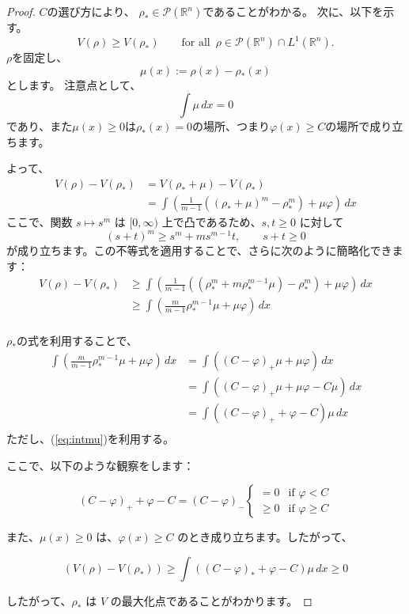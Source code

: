 \documentclass{jsarticle}
\theoremstyle{definition}
\begin{document}
\begin{proof}
  $C$の選び方により、 $\rho_* \in \mathcal{P}(\mathbb{R}^n)$であることがわかる。
  次に、以下を示す。
  $$
  V(\rho) \geq V(\rho_*) \qquad \text{for all } \, \rho \in \mathcal{P}(\mathbb{R}^n) \cap L^1(\mathbb{R}^n).
  $$
  $\rho$を固定し、 
  $$
  \mu(x) := \rho(x) - \rho_*(x)
  $$
  とします。
  注意点として、
  \begin{equation}
    \label{eq:intmu}
     \int \mu \, dx = 0
  \end{equation}
  であり、また$\mu(x) \geq 0$は$\rho_*(x) = 0$の場所、つまり$\varphi(x) \geq C$の場所で成り立ちます。

  よって、
  \begin{align*}
    V(\rho) - V(\rho_*) &= V(\rho_* + \mu) - V(\rho_*)\\
                        &= \int \left(\frac{1}{m-1} ((\rho_* + \mu)^m - \rho_*^{m}) + \mu \varphi \right) \, dx
  \end{align*}
  ここで、関数 $s \mapsto s^m$ は $[0, \infty)$ 上で凸であるため、$s, t \geq 0$ に対して 
  $$
    (s + t)^m \geq s^m + ms^{m-1}t, \qquad s + t \geq 0
  $$ 
  が成り立ちます。この不等式を適用することで、さらに次のように簡略化できます：
  \begin{align*}
    V(\rho) - V(\rho_*) &\geq \int \left(\frac{1}{m-1} ((\rho_*^m + m \rho_*^{m-1} \mu) - \rho_*^{m}) + \mu \varphi \right) \, dx\\
                        &\geq \int \left(\frac{m}{m-1} \rho_*^{m-1}\mu + \mu\varphi\right) \, dx\\
  \end{align*}

  $\rho_*$の式を利用することで、
  \begin{align*}
    \int \left(\frac{m}{m-1} \rho_*^{m-1}\mu + \mu\varphi\right) \, dx &= \int \left((C - \varphi)_+ \mu + \mu\varphi\right) \, dx \\
                                                                       &= \int \left((C - \varphi)_+ \mu + \mu \varphi - C \mu\right) \, dx \\
                                                                       &= \int \left((C - \varphi)_+ + \varphi - C\right)\mu \, dx \\  
  \end{align*}
  ただし、(\ref{eq:intmu})を利用する。

  ここで、以下のような観察をします：

  \[
    (C - \varphi)_+ + \varphi - C = (C - \varphi)_- \begin{cases} = 0 & \text{if } \varphi < C \\ 
                                                                  \geq 0 & \text{if } \varphi \geq C \end{cases}
  \]

  また、\(\mu(x) \geq 0\) は、\(\varphi(x) \geq C\) のとき成り立ちます。したがって、

  \[
     (V(\rho) - V(\rho_*)) \geq \int ((C - \varphi)_* + \varphi - C) \mu \, dx \geq 0
  \]

  したがって、\(\rho_*\) は \(V\) の最大化点であることがわかります。
\end{proof}
\end{document}
